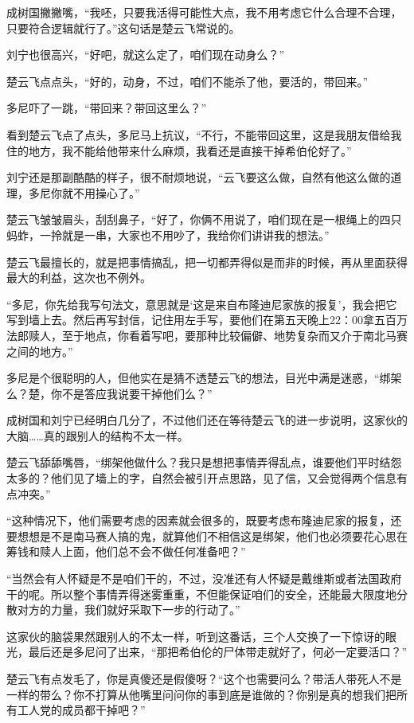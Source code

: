 成树国撇撇嘴，“我呸，只要我活得可能性大点，我不用考虑它什么合理不合理，只要符合逻辑就行了。”这句话是楚云飞常说的。

刘宁也很高兴，“好吧，就这么定了，咱们现在动身么？”

楚云飞点点头，“好的，动身，不过，咱们不能杀了他，要活的，带回来。”

多尼吓了一跳，“带回来？带回这里么？”

看到楚云飞点了点头，多尼马上抗议，“不行，不能带回这里，这是我朋友借给我住的地方，我不能给他带来什么麻烦，我看还是直接干掉希伯伦好了。”

刘宁还是那副酷酷的样子，很不耐烦地说，“云飞要这么做，自然有他这么做的道理，多尼你就不用操心了。”

楚云飞皱皱眉头，刮刮鼻子，“好了，你俩不用说了，咱们现在是一根绳上的四只蚂蚱，一拎就是一串，大家也不用吵了，我给你们讲讲我的想法。”

楚云飞最擅长的，就是把事情搞乱，把一切都弄得似是而非的时候，再从里面获得最大的利益，这次也不例外。

“多尼，你先给我写句法文，意思就是‘这是来自布隆迪尼家族的报复’，我会把它写到墙上去。然后再写封信，记住用左手写，要他们在第五天晚上22：00拿五百万法郎赎人，至于地点，你看着写吧，要那种比较偏僻、地势复杂而又介于南北马赛之间的地方。”

多尼是个很聪明的人，但他实在是猜不透楚云飞的想法，目光中满是迷惑，“绑架么？楚，你不是答应我说要干掉他们么？”

成树国和刘宁已经明白几分了，不过他们还在等待楚云飞的进一步说明，这家伙的大脑……真的跟别人的结构不太一样。

楚云飞舔舔嘴唇，“绑架他做什么？我只是想把事情弄得乱点，谁要他们平时结怨太多的？他们见了墙上的字，自然会被引开点思路，见了信，又会觉得两个信息有点冲突。”

“这种情况下，他们需要考虑的因素就会很多的，既要考虑布隆迪尼家的报复，还要想想是不是南马赛人搞的鬼，就算他们不相信这是绑架，他们也必须要花心思在筹钱和赎人上面，他们总不会不做任何准备吧？”

“当然会有人怀疑是不是咱们干的，不过，没准还有人怀疑是戴维斯或者法国政府干的呢。所以整个事情弄得迷雾重重，不但能保证咱们的安全，还能最大限度地分散对方的力量，我们就好采取下一步的行动了。”

这家伙的脑袋果然跟别人的不太一样，听到这番话，三个人交换了一下惊讶的眼光，最后还是多尼问了出来，“那把希伯伦的尸体带走就好了，何必一定要活口？”

楚云飞有点发毛了，你是真傻还是假傻呀？“这个也需要问么？带活人带死人不是一样的带么？你不打算从他嘴里问问你的事到底是谁做的？你别是真的想我们把所有工人党的成员都干掉吧？”

